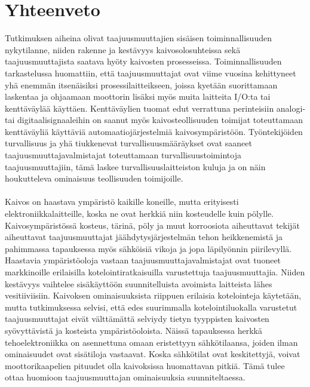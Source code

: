 \documentclass[finnish,12pt,a4paper,pdftex,elec,utf8]{aaltothesis}
\begin{document}
\section{Yhteenveto}
Tutkimuksen aiheina olivat taajuusmuuttajien sisäisen toiminnallisuuden nykytilanne, niiden rakenne ja kestävyys kaivosolosuhteissa sekä taajuusmuuttajista saatava hyöty kaivosten prosesseissa. Toiminnallisuuden tarkastelussa huomattiin, että taajuusmuuttajat ovat viime vuosina kehittyneet yhä enemmän itsenäisiksi prosessilaitteikseen, joissa kyetään suorittamaan laskentaa ja ohjaamaan moottorin lisäksi myös muita laitteita I/O:ta tai kenttäväylää käyttäen. Kenttäväylien tuomat edut verrattuna perinteisiin analogi- tai digitaalisignaaleihin on saanut myös kaivosteollisuuden toimijat toteuttamaan kenttäväyliä käyttäviä automaatiojärjestelmiä kaivosympäristöön. Työntekijöiden turvallisuus ja yhä tiukkenevat turvallisuusmääräykset ovat saaneet taajuusmuuttajavalmistajat toteuttamaan turvallisuustoimintoja taajuusmuuttajiin, tämä laskee turvallisuuslaitteiston kuluja ja on näin houkutteleva ominaisuus teollisuuden toimijoille.
\\\\
Kaivos on haastava ympäristö kaikille koneille, mutta erityisesti elektroniikkalaitteille, koska ne ovat herkkiä niin kosteudelle kuin pölylle. Kaivosympäristössä kosteus, tärinä, pöly ja muut korroosiota aiheuttavat tekijät aiheuttavat taajuusmuuttajat jäähdytysjärjestelmän tehon heikkenemistä ja pahimmassa tapauksessa myös sähköisiä vikoja ja jopa läpilyönnin piirilevyllä. Haastavia ympäristöoloja vastaan taajuusmuuttajavalmistajat ovat tuoneet markkinoille erilaisilla kotelointiratkaisuilla varustettuja taajuusmuuttajia. Niiden kestävyys vaihtelee sisäkäyttöön suunnitelluista avoimista laitteista lähes vesitiiviisiin. Kaivoksen ominaisuuksista riippuen erilaisia kotelointeja käytetään, mutta tutkimuksessa selvisi, että edes suurimmalla kotelointiluokalla varustetut taajuusmuuttajat eivät välttämättä selviydy tietyn tyyppisten kaivosten syövyttävistä ja kosteista ympäristöoloista. Näissä tapauksessa herkkä tehoelektroniikka on asennettuna omaan eristettyyn sähkötilaansa, joiden ilman ominaisuudet ovat sisätiloja vastaavat. Koska sähkötilat ovat keskitettyjä, voivat moottorikaapelien pituudet olla kaivoksissa huomattavan pitkiä. Tämä tulee ottaa huomioon taajuusmuuttajan ominaisuuksia suunniteltaessa. 
\\\\
\end{document}
